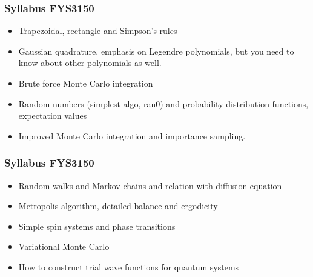 \documentclass{beamer}
\newenvironment{block_mdfboxadmon}[1][]{\begin{block}{#1}}{\end{block}}
\begin{document}
\begin{frame}
\frametitle{Syllabus FYS3150}

\begin{block_mdfboxadmon}
\begin{itemize}
  \item Trapezoidal, rectangle and Simpson's rules

  \item Gaussian quadrature, emphasis on Legendre polynomials, but you need to know about other polynomials as well.

  \item Brute force Monte Carlo integration

  \item Random numbers (simplest algo, ran0) and probability distribution functions, expectation values

  \item Improved Monte Carlo integration and importance sampling.
\end{itemize}

\noindent
\end{block_mdfboxadmon}
\end{frame}

\begin{frame}
\frametitle{Syllabus FYS3150}

\begin{block_mdfboxadmon}
\begin{itemize}
  \item Random walks and Markov chains and relation with diffusion equation

  \item Metropolis algorithm, detailed balance and ergodicity

  \item Simple spin systems and phase transitions

  \item Variational Monte Carlo

  \item How to construct trial wave functions for quantum systems
\end{itemize}

\noindent
\end{block_mdfboxadmon}
\end{frame}
\end{document}
